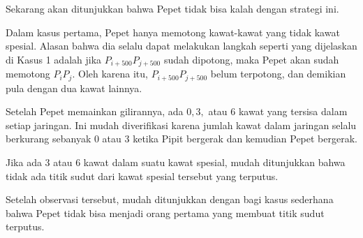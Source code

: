 \documentclass[11pt]{scrartcl}
\begin{document}
\begin{soaljawab}
\begin{solusi}
Sekarang akan ditunjukkan bahwa Pepet tidak bisa kalah dengan strategi ini.

Dalam kasus pertama, Pepet hanya memotong kawat-kawat yang tidak kawat spesial. Alasan bahwa dia selalu dapat melakukan langkah seperti yang dijelaskan di Kasus 1 adalah jika $P_{i+500}P_{j+500}$ sudah dipotong, maka Pepet akan sudah memotong $P_iP_j$. Oleh karena itu, $P_{i+500}P_{j+500}$ belum terpotong, dan demikian pula dengan dua kawat lainnya.

Setelah Pepet memainkan gilirannya, ada $0, 3,$ atau $6$ kawat yang tersisa dalam setiap jaringan. Ini mudah diverifikasi karena jumlah kawat dalam jaringan selalu berkurang sebanyak $0$ atau $3$ ketika Pipit bergerak dan kemudian Pepet bergerak.

Jika ada $3$ atau $6$ kawat dalam suatu kawat spesial, mudah ditunjukkan bahwa tidak ada titik sudut dari kawat spesial tersebut yang terputus. 

Setelah observasi tersebut, mudah ditunjukkan dengan bagi kasus sederhana bahwa Pepet tidak bisa menjadi orang pertama yang membuat titik sudut terputus.
    \end{solusi}
\end{soaljawab}
\end{document}
